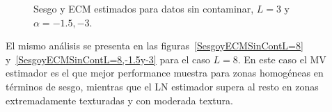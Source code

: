 \begin{figure}[H]
	\caption{\label{SesgoyECMSinContL=3,-1.5y-3}\small Sesgo y ECM estimados para datos sin contaminar, $ L=3$ y $\alpha=-1.5, -3$.}
\end{figure}

El mismo análisis se presenta en las figuras~\ref{SesgoyECMSinContL=8} y~\ref{SesgoyECMSinContL=8,-1.5y-3} para el caso $L=8$. En este caso el MV estimador es el que mejor performance muestra para zonas homogéneas en términos de sesgo, mientras que el LN estimador supera al resto en zonas extremadamente texturadas y con moderada textura.

